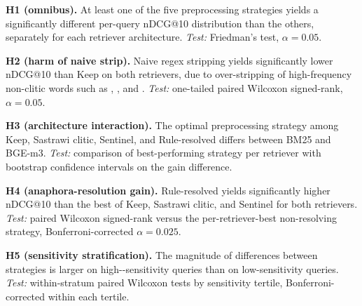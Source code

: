 
\noindent\textbf{H1 (omnibus).} At least one of the five preprocessing strategies yields a significantly different per-query nDCG@10 distribution than the others, separately for each retriever architecture. \textit{Test:} Friedman's test, $\alpha = 0.05$.

\smallskip
\noindent\textbf{H2 (harm of naive strip).} Naive regex  stripping yields significantly lower nDCG@10 than Keep on both retrievers, due to over-stripping of high-frequency non-clitic words such as , , and . \textit{Test:} one-tailed paired Wilcoxon signed-rank, $\alpha = 0.05$.

\smallskip
\noindent\textbf{H3 (architecture interaction).} The optimal preprocessing strategy among Keep, Sastrawi clitic, Sentinel, and Rule-resolved differs between BM25 and BGE-m3. \textit{Test:} comparison of best-performing strategy per retriever with bootstrap confidence intervals on the gain difference.

\smallskip
\noindent\textbf{H4 (anaphora-resolution gain).} Rule-resolved yields significantly higher nDCG@10 than the best of Keep, Sastrawi clitic, and Sentinel for both retrievers. \textit{Test:} paired Wilcoxon signed-rank versus the per-retriever-best non-resolving strategy, Bonferroni-corrected $\alpha = 0.025$.

\smallskip
\noindent\textbf{H5 (sensitivity stratification).} The magnitude of differences between strategies is larger on high--sensitivity queries than on low-sensitivity queries. \textit{Test:} within-stratum paired Wilcoxon tests by sensitivity tertile, Bonferroni-corrected within each tertile.
